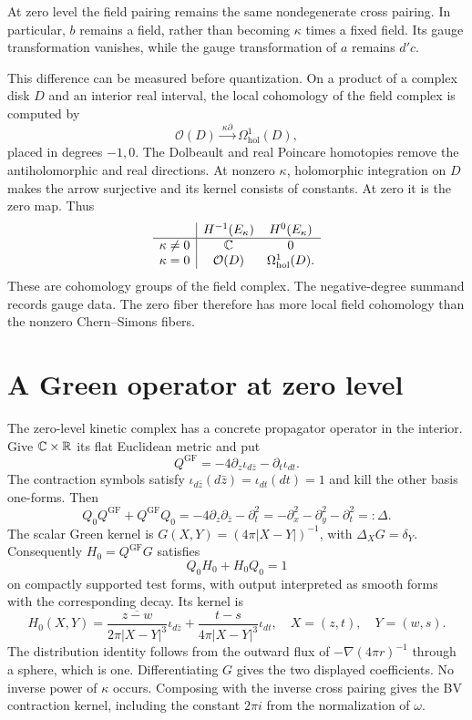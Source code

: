 At zero level the field pairing remains the same nondegenerate cross
pairing.  In particular, $b$ remains a field, rather than becoming
$\kappa$ times a fixed field.  Its gauge transformation vanishes,
while the gauge transformation of $a$ remains $d'c$.

This difference can be measured before quantization.  On a product
of a complex disk $D$ and an interior real interval, the local
cohomology of the field complex is computed by
\[
 \mathcal O(D)\xrightarrow{\ \kappa\partial\ }
 \Omega^1_{\mathrm{hol}}(D),
\]
placed in degrees $-1,0$.  The Dolbeault and real Poincare homotopies
remove the antiholomorphic and real directions.  At nonzero $\kappa$,
holomorphic integration on $D$ makes the arrow surjective and its
kernel consists of constants.  At zero it is the zero map.  Thus
\[
\begin{array}{c|cc}
 &H^{-1}(E_\kappa)&H^0(E_\kappa)\\\hline
 \kappa\ne0&\mathbb C&0\\
 \kappa=0&\mathcal O(D)&\Omega^1_{\mathrm{hol}}(D).
\end{array}
\]
These are cohomology groups of the field complex.  The negative-degree
summand records gauge data.  The zero fiber therefore has more local
field cohomology than the nonzero Chern--Simons fibers.

\section{A Green operator at zero level}

The zero-level kinetic complex has a concrete propagator operator in
the interior.  Give $\mathbb C\times\mathbb R$ its flat Euclidean metric and put
\[
 Q^{\mathrm{GF}}=-4\partial_z\iota_{d\bar z}
                         -\partial_t\iota_{dt}.
\]
The contraction symbols satisfy
$\iota_{d\bar z}(d\bar z)=\iota_{dt}(dt)=1$ and kill the other
basis one-forms.  Then
\[
 Q_0Q^{\mathrm{GF}}+Q^{\mathrm{GF}}Q_0
 =-4\partial_z\partial_{\bar z}-\partial_t^2
 =-\partial_x^2-\partial_y^2-\partial_t^2=:\Delta.
\]
The scalar Green kernel is
$G(X,Y)=(4\pi|X-Y|)^{-1}$, with $\Delta_XG=\delta_Y$.
Consequently $H_0=Q^{\mathrm{GF}}G$ satisfies
\[
 Q_0H_0+H_0Q_0=1
\]
on compactly supported test forms, with output interpreted as smooth
forms with the corresponding decay.  Its kernel is
\[
 H_0(X,Y)=
 \frac{\overline{z-w}}{2\pi|X-Y|^3}\iota_{d\bar z}
 +\frac{t-s}{4\pi|X-Y|^3}\iota_{dt},
 \quad X=(z,t),\quad Y=(w,s).
\]
The distribution identity follows from the outward flux of
$-\nabla(4\pi r)^{-1}$ through a sphere, which is one.
Differentiating $G$ gives the two displayed coefficients.
No inverse power of $\kappa$ occurs.  Composing with the inverse
cross pairing gives the BV contraction kernel, including the constant
$2\pi i$ from the normalization of $\omega$.

